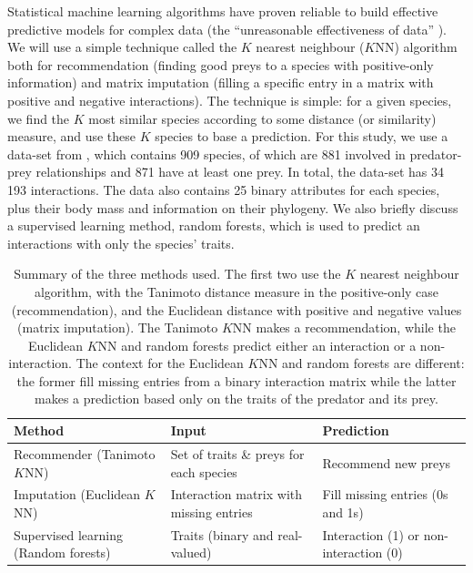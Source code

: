 \documentclass[letterpaper]{article}
\begin{document}
Statistical machine learning algorithms \cite{mur12} have proven reliable to
build effective predictive models for complex data (the ``unreasonable
effectiveness of data'' \cite{hal09}). We will use a simple technique called
the $K$ nearest neighbour ($K$NN) algorithm both for recommendation (finding
good preys to a species with positive-only information) and matrix imputation
(filling a specific entry in a matrix with positive and negative interactions).
The technique is simple: for a given species, we find the $K$ most similar
species according to some distance (or similarity) measure, and use these $K$
species to base a prediction. For this study, we use a data-set from
\cite{dig14}, which contains 909 species, of which are 881 involved in
predator-prey relationships and 871 have at least one prey. In total, the
data-set has 34 193 interactions. The data also contains 25 binary attributes
for each species, plus their body mass and information on their phylogeny.
We also briefly discuss a supervised learning method, random forests, which is
used to predict an interactions with only the species' traits.

\begin{table}
  \centering
  \begin{tabular}{|lll|}
    \hline
    Method                                 & Input                                    & Prediction \\
    \hline
    \hline
    Recommender (Tanimoto $K$NN)           & Set of traits \& preys for each species  & Recommend new preys\\
    Imputation (Euclidean $K$NN)           & Interaction matrix with missing entries  & Fill missing entries (0s and 1s)\\
    Supervised learning (Random forests)   & Traits (binary and real-valued)          & Interaction (1) or non-interaction (0)\\
    \hline
  \end{tabular}

  \caption{Summary of the three methods used. The first two use the $K$ nearest
  neighbour algorithm, with the Tanimoto distance measure in the positive-only
  case (recommendation), and the Euclidean distance with positive and negative
  values (matrix imputation). The Tanimoto $K$NN makes a recommendation, while
  the Euclidean $K$NN and random forests predict either an interaction or
  a non-interaction. The context for the Euclidean $K$NN and random forests are
  different: the former fill missing entries from a binary interaction matrix
  while the latter makes a prediction based only on the traits of the predator
  and its prey.}

  \label{table:methods_summary}
\end{table}
\end{document}
